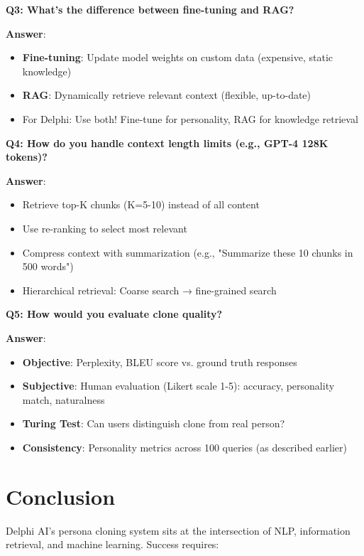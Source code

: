 \documentclass[10pt]{article}
\begin{document}
\textbf{Q3: What's the difference between fine-tuning and RAG?}

\textbf{Answer}:
\begin{itemize}[leftmargin=*]
    \item \textbf{Fine-tuning}: Update model weights on custom data (expensive, static knowledge)
    \item \textbf{RAG}: Dynamically retrieve relevant context (flexible, up-to-date)
    \item For Delphi: Use both! Fine-tune for personality, RAG for knowledge retrieval
\end{itemize}

\textbf{Q4: How do you handle context length limits (e.g., GPT-4 128K tokens)?}

\textbf{Answer}:
\begin{itemize}[leftmargin=*]
    \item Retrieve top-K chunks (K=5-10) instead of all content
    \item Use re-ranking to select most relevant
    \item Compress context with summarization (e.g., "Summarize these 10 chunks in 500 words")
    \item Hierarchical retrieval: Coarse search → fine-grained search
\end{itemize}

\textbf{Q5: How would you evaluate clone quality?}

\textbf{Answer}:
\begin{itemize}[leftmargin=*]
    \item \textbf{Objective}: Perplexity, BLEU score vs. ground truth responses
    \item \textbf{Subjective}: Human evaluation (Likert scale 1-5): accuracy, personality match, naturalness
    \item \textbf{Turing Test}: Can users distinguish clone from real person?
    \item \textbf{Consistency}: Personality metrics across 100 queries (as described earlier)
\end{itemize}

\section{Conclusion}

Delphi AI's persona cloning system sits at the intersection of NLP, information retrieval, and machine learning. Success requires:
\end{document}

